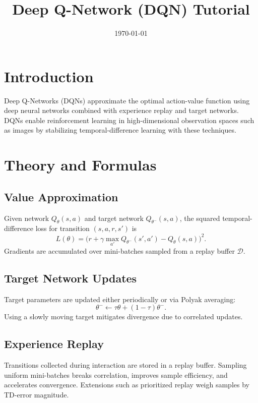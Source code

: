 ﻿\documentclass[12pt]{article}
\title{Deep Q-Network (DQN) Tutorial}
\author{}
\date{\today}
\begin{document}
\maketitle

\section{Introduction}
Deep Q-Networks (DQNs) approximate the optimal action-value function using deep neural networks combined with experience replay and target networks. DQNs enable reinforcement learning in high-dimensional observation spaces such as images by stabilizing temporal-difference learning with these techniques.

\section{Theory and Formulas}
\subsection{Value Approximation}
Given network \(Q_\theta(s,a)\) and target network \(Q_{\theta^-}(s,a)\), the squared temporal-difference loss for transition \((s,a,r,s')\) is
\begin{equation}
L(\theta) = \Big( r + \gamma \max_{a'} Q_{\theta^-}(s',a') - Q_\theta(s,a) \Big)^2.
\end{equation}
Gradients are accumulated over mini-batches sampled from a replay buffer \(\mathcal{D}\).

\subsection{Target Network Updates}
Target parameters are updated either periodically or via Polyak averaging:
\begin{equation}
\theta^- \leftarrow \tau \theta + (1-\tau) \theta^-.
\end{equation}
Using a slowly moving target mitigates divergence due to correlated updates.

\subsection{Experience Replay}
Transitions collected during interaction are stored in a replay buffer. Sampling uniform mini-batches breaks correlation, improves sample efficiency, and accelerates convergence. Extensions such as prioritized replay weigh samples by TD-error magnitude.
\end{document}
